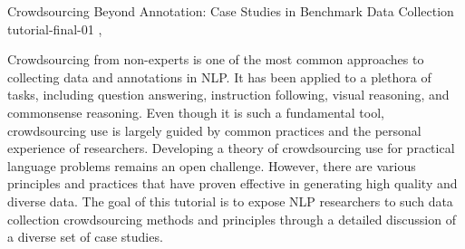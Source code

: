 \begin{tutorial}
  {Crowdsourcing Beyond Annotation: Case Studies in Benchmark Data Collection}
  {tutorial-final-01}
  {\daydateyear, \tutorialmorningtime}
  {\TutLocA}

Crowdsourcing from non-experts is one of the most common approaches to collecting data and annotations in NLP. It has been applied to a plethora of tasks, including question answering, instruction following, visual reasoning, and commonsense reasoning. Even though it is such a fundamental tool, crowdsourcing use is largely guided by common practices and the personal experience of researchers. Developing a theory of crowdsourcing use for practical language problems remains an open challenge. However, there are various principles and practices that have proven effective in generating high quality and diverse data. The goal of this tutorial is to expose NLP researchers to such data collection crowdsourcing methods and principles through a detailed discussion of a diverse set of case studies.

\end{tutorial}